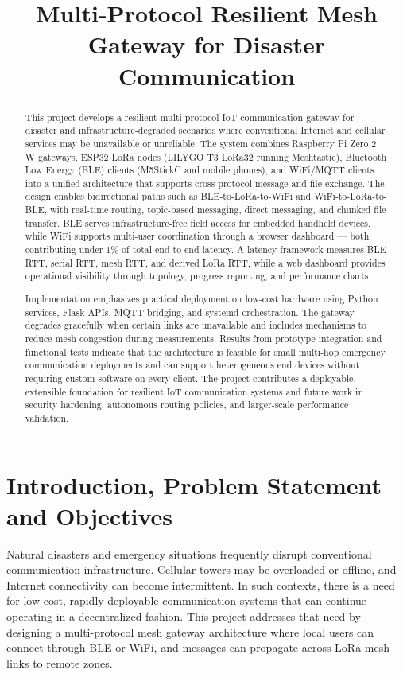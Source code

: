 \documentclass[conference]{IEEEtran}
\title{Multi-Protocol Resilient Mesh Gateway for Disaster Communication}
\author{
\IEEEauthorblockN{
Jerald Goh\IEEEauthorrefmark{1},
Amelia\IEEEauthorrefmark{1},
Xuan\IEEEauthorrefmark{2},
Chng Yi Xuan\IEEEauthorrefmark{2}
}
\IEEEauthorblockA{\IEEEauthorrefmark{1}Computing Science, Singapore Institute of Technology}
\IEEEauthorblockA{\IEEEauthorrefmark{2}Information and Communication Technology Cluster, Singapore Institute of Technology}
}
\begin{document}
\maketitle

\begin{abstract}
This project develops a resilient multi-protocol IoT communication gateway for disaster and infrastructure-degraded scenarios where conventional Internet and cellular services may be unavailable or unreliable. The system combines Raspberry Pi Zero 2 W gateways, ESP32 LoRa nodes (LILYGO T3 LoRa32 running Meshtastic), Bluetooth Low Energy (BLE) clients (M5StickC and mobile phones), and WiFi/MQTT clients into a unified architecture that supports cross-protocol message and file exchange. The design enables bidirectional paths such as BLE-to-LoRa-to-WiFi and WiFi-to-LoRa-to-BLE, with real-time routing, topic-based messaging, direct messaging, and chunked file transfer. BLE serves infrastructure-free field access for embedded handheld devices, while WiFi supports multi-user coordination through a browser dashboard — both contributing under 1\% of total end-to-end latency. A latency framework measures BLE RTT, serial RTT, mesh RTT, and derived LoRa RTT, while a web dashboard provides operational visibility through topology, progress reporting, and performance charts.

Implementation emphasizes practical deployment on low-cost hardware using Python services, Flask APIs, MQTT bridging, and systemd orchestration. The gateway degrades gracefully when certain links are unavailable and includes mechanisms to reduce mesh congestion during measurements. Results from prototype integration and functional tests indicate that the architecture is feasible for small multi-hop emergency communication deployments and can support heterogeneous end devices without requiring custom software on every client. The project contributes a deployable, extensible foundation for resilient IoT communication systems and future work in security hardening, autonomous routing policies, and larger-scale performance validation.
\end{abstract}

\section{Introduction, Problem Statement and Objectives}
Natural disasters and emergency situations frequently disrupt conventional communication infrastructure. Cellular towers may be overloaded or offline, and Internet connectivity can become intermittent. In such contexts, there is a need for low-cost, rapidly deployable communication systems that can continue operating in a decentralized fashion. This project addresses that need by designing a multi-protocol mesh gateway architecture where local users can connect through BLE or WiFi, and messages can propagate across LoRa mesh links to remote zones.
\end{document}
